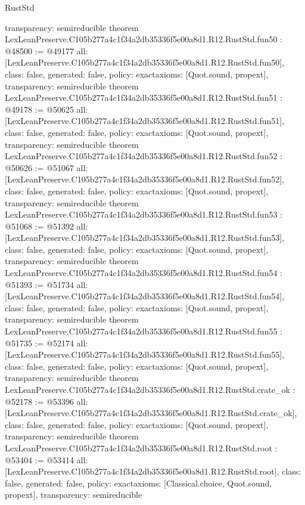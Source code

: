 \begin{lexlean}{RustStd}
\begin{coremodule}
{  transparency: semireducible
}
theorem LexLeanPreserve.C105b277a4c1f34a2db35336f5e00a8d1.R12.RustStd.fun50 : @48500 := @49177 {
  all: [LexLeanPreserve.C105b277a4c1f34a2db35336f5e00a8d1.R12.RustStd.fun50],
  class: false,
  generated: false,
  policy: exact{axioms: [Quot.sound, propext]},
  transparency: semireducible
}
theorem LexLeanPreserve.C105b277a4c1f34a2db35336f5e00a8d1.R12.RustStd.fun51 : @49178 := @50625 {
  all: [LexLeanPreserve.C105b277a4c1f34a2db35336f5e00a8d1.R12.RustStd.fun51],
  class: false,
  generated: false,
  policy: exact{axioms: [Quot.sound, propext]},
  transparency: semireducible
}
theorem LexLeanPreserve.C105b277a4c1f34a2db35336f5e00a8d1.R12.RustStd.fun52 : @50626 := @51067 {
  all: [LexLeanPreserve.C105b277a4c1f34a2db35336f5e00a8d1.R12.RustStd.fun52],
  class: false,
  generated: false,
  policy: exact{axioms: [Quot.sound, propext]},
  transparency: semireducible
}
theorem LexLeanPreserve.C105b277a4c1f34a2db35336f5e00a8d1.R12.RustStd.fun53 : @51068 := @51392 {
  all: [LexLeanPreserve.C105b277a4c1f34a2db35336f5e00a8d1.R12.RustStd.fun53],
  class: false,
  generated: false,
  policy: exact{axioms: [Quot.sound, propext]},
  transparency: semireducible
}
theorem LexLeanPreserve.C105b277a4c1f34a2db35336f5e00a8d1.R12.RustStd.fun54 : @51393 := @51734 {
  all: [LexLeanPreserve.C105b277a4c1f34a2db35336f5e00a8d1.R12.RustStd.fun54],
  class: false,
  generated: false,
  policy: exact{axioms: [Quot.sound, propext]},
  transparency: semireducible
}
theorem LexLeanPreserve.C105b277a4c1f34a2db35336f5e00a8d1.R12.RustStd.fun55 : @51735 := @52174 {
  all: [LexLeanPreserve.C105b277a4c1f34a2db35336f5e00a8d1.R12.RustStd.fun55],
  class: false,
  generated: false,
  policy: exact{axioms: [Quot.sound, propext]},
  transparency: semireducible
}
theorem LexLeanPreserve.C105b277a4c1f34a2db35336f5e00a8d1.R12.RustStd.crate_ok : @52178 := @53396 {
  all: [LexLeanPreserve.C105b277a4c1f34a2db35336f5e00a8d1.R12.RustStd.crate_ok],
  class: false,
  generated: false,
  policy: exact{axioms: [Quot.sound, propext]},
  transparency: semireducible
}
theorem LexLeanPreserve.C105b277a4c1f34a2db35336f5e00a8d1.R12.RustStd.root : @53404 := @53414 {
  all: [LexLeanPreserve.C105b277a4c1f34a2db35336f5e00a8d1.R12.RustStd.root],
  class: false,
  generated: false,
  policy: exact{axioms: [Classical.choice, Quot.sound, propext]},
  transparency: semireducible
}


\end{coremodule}
\end{lexlean}

